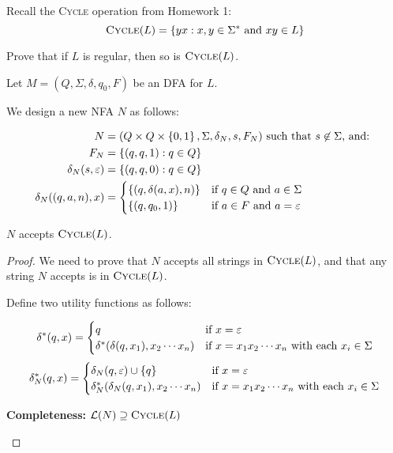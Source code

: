 \begin{problem}
  Recall the \textsc{Cycle} operation from Homework 1:
  \[ \textsc{Cycle}(L) = \left\{yx : x, y \in \Sigma^* \text{ and } xy \in L\right\} \]
  
  \step
  Prove that if $L$ is regular, then so is $\textsc{Cycle}(L)$.
  \begin{Answer}
    Let $M = (Q, \Sigma, \delta, q_0, F)$ be an DFA for $L$.
    
    \step
    We design a new NFA $N$ as follows:

    \begin{align}
      N &= (Q \times Q \times \left\{0, 1\right\}, \Sigma, \delta_N, s, F_N) \text{ such that $s \not\in \Sigma$, and: }\nonumber \\
      F_N &= \left\{(q, q, 1) : q \in Q\right\}\\
      \delta_N(s, \varepsilon) &= \left\{(q, q, 0) : q \in Q\right\}\\
      \delta_N((q, a, n), x) &=
        \begin{cases}
          \left\{(q, \delta(a, x), n)\right\} &\text{if } q \in Q \text{ and } a \in \Sigma\\
          \left\{(q, q_0, 1)\right\} & \text{if } a \in F \text{ and } a = \varepsilon
        \end{cases}
    \end{align}

    \newpage
    \begin{claim}
      $N$ accepts $\textsc{Cycle}(L)$.

      \begin{proof}
        We need to prove that $N$ accepts all strings in $\textsc{Cycle}(L)$,
        and that any string $N$ accepts is in $\textsc{Cycle}(L)$.

        \step
        Define two utility functions as follows:

        \[ \delta^*(q, x) =
          \begin{cases}
            q & \text{if } x = \varepsilon \\
            \delta^*(\delta(q, x_1), x_2 \cdots x_n) & \text{if $x = x_1 x_2 \cdots x_n$ with each $x_i \in \Sigma$}
          \end{cases}
        \]
        \[ \delta_N^*(q, x) =
          \begin{cases}
            \delta_N(q, \varepsilon) \cup \left\{q\right\} & \text{if } x = \varepsilon \\
            \delta_N^*(\delta_N(q, x_1), x_2 \cdots x_n) & \text{if $x = x_1 x_2 \cdots x_n$ with each $x_i \in \Sigma$}
          \end{cases}
        \]
        \begin{enumroman}
          \item \textbf{Completeness:} $\mathcal{L}(N) \supseteq \textsc{Cycle}(L)$
          

\end{enumroman}
\end{proof}
\end{claim}
\end{Answer}
\end{problem}
